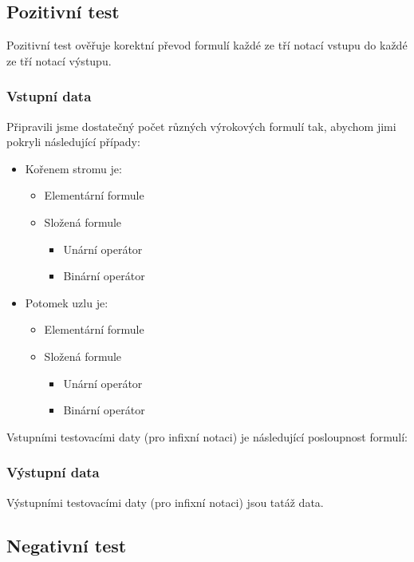 \documentclass[thesis=B,czech,hidelinks]{thesis}[2012/06/26]
\begin{document}
\subsection{Pozitivní test}

Pozitivní test ověřuje korektní převod formulí každé ze tří notací vstupu do každé ze tří notací výstupu.

\subsubsection{Vstupní data}

Připravili jsme dostatečný počet různých výrokových formulí tak, abychom jimi pokryli následující případy:

\begin{itemize}
	\item Kořenem stromu je:
	\begin{itemize}
		\item Elementární formule
		\item Složená formule
		\begin{itemize}
			\item Unární operátor
			\item Binární operátor
		\end{itemize}
	\end{itemize}
	\item Potomek uzlu je:
	\begin{itemize}
		\item Elementární formule
		\item Složená formule
		\begin{itemize}
			\item Unární operátor
			\item Binární operátor
		\end{itemize}
	\end{itemize}
\end{itemize}

Vstupními testovacími daty (pro infixní notaci) je následující posloupnost formulí:



\subsubsection{Výstupní data}

Výstupními testovacími daty (pro infixní notaci) jsou tatáž data.

\subsection{Negativní test}
\end{document}
